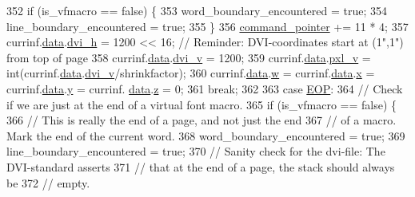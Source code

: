 \begin{DoxyCode}
{352           \textcolor{keywordflow}{if} (is\_vfmacro == \textcolor{keyword}{false}) \{
353             word\_boundary\_encountered = \textcolor{keyword}{true};
354             line\_boundary\_encountered = \textcolor{keyword}{true};
355           \}
356           \hyperlink{classbigEndianByteReader_aa8919f6fe116fd3230337675fd23abac}{command\_pointer} += 11 * 4;
357           currinf.\hyperlink{structdrawinf_af73f66288002f0a25c7843a534bf1340}{data}.\hyperlink{structframedata_a530699c241126f99b81cee11c2c1c4e4}{dvi\_h} = 1200 << 16; \textcolor{comment}{// Reminder: DVI-coordinates start at (1",1") from top
       of page}
358           currinf.\hyperlink{structdrawinf_af73f66288002f0a25c7843a534bf1340}{data}.\hyperlink{structframedata_a9497085c5712ee20cc25eaa37ea902b6}{dvi\_v} = 1200;
359           currinf.\hyperlink{structdrawinf_af73f66288002f0a25c7843a534bf1340}{data}.\hyperlink{structframedata_a0e7316fa88b0240baa7ce526650131a9}{pxl\_v} = int(currinf.\hyperlink{structdrawinf_af73f66288002f0a25c7843a534bf1340}{data}.\hyperlink{structframedata_a9497085c5712ee20cc25eaa37ea902b6}{dvi\_v}/shrinkfactor);
360           currinf.\hyperlink{structdrawinf_af73f66288002f0a25c7843a534bf1340}{data}.\hyperlink{structframedata_a41ba8896ec8b4ea0765b13c36fd9d18e}{w} = currinf.\hyperlink{structdrawinf_af73f66288002f0a25c7843a534bf1340}{data}.\hyperlink{structframedata_a487a6e23e33001a732d8ed5c6f245f1d}{x} = currinf.\hyperlink{structdrawinf_af73f66288002f0a25c7843a534bf1340}{data}.\hyperlink{structframedata_a383e2dc0b450b26619b86c9025c6ecae}{y} = currinf.
      \hyperlink{structdrawinf_af73f66288002f0a25c7843a534bf1340}{data}.\hyperlink{structframedata_a563f47ad708ba389b24d1d89a63a7ec4}{z} = 0;
361           \textcolor{keywordflow}{break};
362 
363         \textcolor{keywordflow}{case} \hyperlink{dvi_8h_a734579b908509b57151ac02b946056d1}{EOP}:
364           \textcolor{comment}{// Check if we are just at the end of a virtual font macro.}
365           \textcolor{keywordflow}{if} (is\_vfmacro == \textcolor{keyword}{false}) \{
366             \textcolor{comment}{// This is really the end of a page, and not just the end}
367             \textcolor{comment}{// of a macro. Mark the end of the current word.}
368             word\_boundary\_encountered = \textcolor{keyword}{true};
369             line\_boundary\_encountered = \textcolor{keyword}{true};
370             \textcolor{comment}{// Sanity check for the dvi-file: The DVI-standard asserts}
371             \textcolor{comment}{// that at the end of a page, the stack should always be}
372             \textcolor{comment}{// empty.}
}
\end{DoxyCode}
